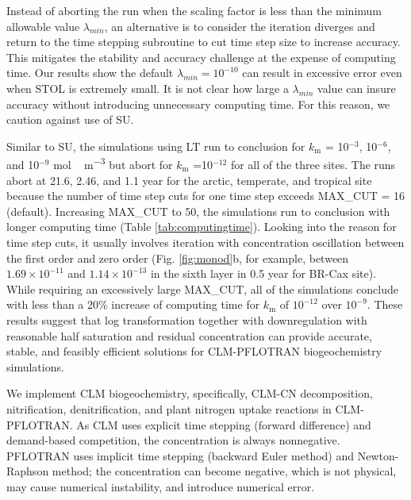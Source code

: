 \documentclass[gmd, manuscript]{copernicus}
\begin{document}
Instead of aborting the run when the scaling factor is less than the minimum
allowable value $\lambda_{min}$, an alternative is to consider the iteration
diverges and return to the time stepping subroutine to cut time step size to
increase accuracy. This mitigates the stability and accuracy challenge at the
expense of computing time. Our results show the default $\lambda_{min} =
10^{-10}$ can result in excessive error even when STOL is extremely small. It
is not clear how large a $\lambda_{min}$ value can insure accuracy without
introducing unnecessary computing time. For this
reason, we caution against use of SU. 

Similar to SU, the simulations using LT run to conclusion for $k_\text{m}$ =
10$^{-3}$, 10$^{-6}$, and 10$^{-9}$ \unit{mol\,m^{-3}} but abort for
$k_\text{m}$ =10$^{-12}$ for all of the three sites. The runs abort at 21.6,
2.46, and 1.1 year for the arctic, temperate, and tropical site because the
number of time step cuts for one time step exceeds MAX\_CUT = 16 (default).
Increasing MAX\_CUT to 50, the simulations run to conclusion with longer
computing time (Table \ref{tab:computingtime}). Looking into the reason for
time step cuts, it usually involves iteration with  concentration
oscillation between the first order and zero order (Fig. \ref{fig:monod}b,
for example, between $1.69\times10^{-11}$ and $1.14\times10^{-13}$ in the sixth
layer in 0.5 year for BR-Cax site). While requiring an excessively large
MAX\_CUT, all of the simulations conclude with less than a 20\% increase of
computing time for $k_\text{m}$ of $10^{-12}$ over $10^{-9}$. These results
suggest that log transformation together with downregulation with reasonable
half saturation and residual concentration can provide accurate, stable, and
feasibly efficient solutions for CLM-PFLOTRAN biogeochemistry simulations.  
   
  

%

We implement CLM biogeochemistry, specifically, CLM-CN decomposition,
nitrification, denitrification, and plant nitrogen uptake reactions in CLM-PFLOTRAN. As
CLM uses explicit time stepping (forward difference) and demand-based
competition, the concentration is always nonnegative. PFLOTRAN uses implicit
time stepping (backward Euler method) and Newton-Raphson method; the
concentration can become negative, which is not physical, may cause numerical
instability, and introduce numerical error. 
\end{document}
